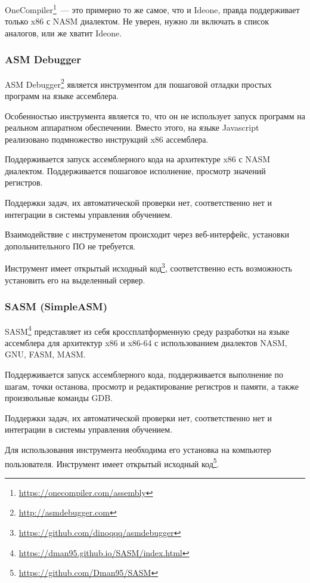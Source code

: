 \documentclass[a4paper,article,14pt]{extarticle}
\begin{document}
OneCompiler\footnote{\url{https://onecompiler.com/assembly}}~--- это примерно то же самое, что и Ideone, правда поддерживает только x86 с NASM диалектом. Не уверен, нужно ли включать в список аналогов, или же хватит Ideone.

\subsubsection{ASM Debugger}

ASM Debugger\footnote{\url{http://asmdebugger.com}} является инструментом для пошаговой отладки простых программ на языке ассемблера.

Особенностью инструмента является то, что он не использует запуск программ на реальном аппаратном обеспечении. Вместо этого, на языке Javascript реализовано подмножество инструкций x86 ассемблера.

Поддерживается запуск ассемблерного кода на архитектуре x86 с NASM диалектом. Поддерживается пошаговое исполнение, просмотр значений регистров.

Поддержки задач, их автоматической проверки нет, соответственно нет и интеграции в системы управления обучением.

Взаимодействие с инструменетом происходит через веб-интерфейс, установки допольнительного ПО не требуется.

Инструмент имеет открытый исходный код\footnote{\url{https://github.com/dinoqqq/asmdebugger}}, соответственно есть возможность установить его на выделенный сервер.

\subsubsection{SASM (SimpleASM)}

SASM\footnote{\url{https://dman95.github.io/SASM/index.html}} представляет из себя кроссплатформенную среду разработки на языке ассемблера для архитектур x86 и x86-64 с использованием диалектов NASM, GNU, FASM, MASM.

Поддерживается запуск ассемблерного кода, поддерживается выполнение по шагам, точки останова, просмотр и редактирование регистров и памяти, а также произвольные команды GDB.

Поддержки задач, их автоматической проверки нет, соответственно нет и интеграции в системы управления обучением.

Для использования инструмента необходима его установка на компьютер пользователя. Инструмент имеет открытый исходный код\footnote{\url{https://github.com/Dman95/SASM}}.
\end{document}
